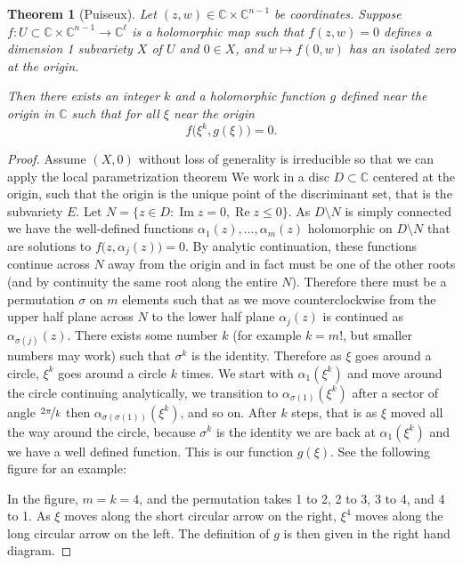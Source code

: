 \documentclass[12pt,openany]{book}
\renewcommand{\Re}{\operatorname{Re}}
\renewcommand{\Im}{\operatorname{Im}}
\newcommand{\C}{{\mathbb{C}}}
\newcommand{\myindex}[1]{#1\index{#1}}
\theoremstyle{plain}
\newtheorem{thm}{Theorem}[section]
\theoremstyle{remark}
\theoremstyle{definition}
\theoremstyle{exercise}
\theoremstyle{example}
\begin{document}
\begin{thm}[\myindex{Puiseux}]
Let $(z,w) \in \C \times \C^{n-1}$ be coordinates.
Suppose $f \colon U \subset \C \times \C^{n-1} \to \C^\ell$
is a holomorphic map such that
$f(z,w) = 0$ defines a dimension 1 subvariety $X$ of $U$
and $0 \in X$,
and $w \mapsto f(0,w)$ has an isolated zero at the origin.

Then there exists an integer $k$ and a holomorphic function $g$ defined near
the origin in $\C$ such that
for all $\xi$ near the origin
\begin{equation*}
f\bigl(\xi^k,g(\xi)\bigr) = 0 .
\end{equation*}
\end{thm}

\begin{proof}
Assume $(X,0)$ without loss of generality is irreducible so that
we can apply the local parametrization theorem
We work in a disc $D \subset \C$ centered at the origin, such that the
origin is the unique point of the discriminant set, that is the subvariety
$E$.  Let $N = \{ z \in D : \Im z = 0 , \Re z \leq 0 \}$.
As $D \setminus N$ is simply connected we have the well-defined functions
$\alpha_1(z),\ldots,\alpha_m(z)$ holomorphic on $D \setminus N$
that are solutions to $f\bigl(z,\alpha_j(z)\bigr) = 0$.
By analytic continuation, these functions continue across $N$ away from the
origin and in fact must be one of the other roots (and by continuity the
same root along the entire $N$).  Therefore there must be
a permutation $\sigma$ on $m$ elements such that as we move
counterclockwise from the upper half plane across $N$ to the lower half
plane $\alpha_j(z)$ is continued as $\alpha_{\sigma(j)}(z)$.
There exists some number $k$ (for example $k=m!$, but smaller numbers may
work) such that $\sigma^k$ is the identity.  Therefore as $\xi$ goes around
a circle, $\xi^k$ goes around a circle $k$ times.  We start with
$\alpha_1(\xi^k)$ and move around the circle continuing analytically, we
transition to $\alpha_{\sigma(1)}(\xi^k)$ after a sector of angle
$\nicefrac{2\pi}{k}$ then
$\alpha_{\sigma(\sigma(1))}(\xi^k)$, and so on.  After $k$ steps, that is as
$\xi$ moved all the way around the circle, because
$\sigma^k$ is the identity we are back at $\alpha_1(\xi^k)$ and we have a
well defined function.  This is our function $g(\xi)$.
See the following figure for an example:
\begin{center}

\end{center}
In the figure, $m = k = 4$, and the permutation takes 1 to 2, 2 to 3, 3 to 4,
and 4 to 1.  As $\xi$ moves along the short circular arrow on the right, $\xi^4$
moves along the long circular arrow on the left.  The definition of $g$ is
then given in the right hand diagram.
\end{proof}
\end{document}
